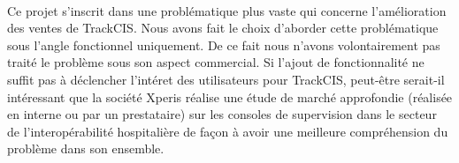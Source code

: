 	\paragraph{}
	Ce projet s'inscrit dans une problématique plus
	vaste qui concerne l'amélioration des ventes de TrackCIS. Nous avons fait le
	choix d'aborder cette problématique sous l'angle fonctionnel uniquement. De ce
	fait nous n'avons volontairement pas traité le problème sous son aspect
	commercial. Si l'ajout de fonctionnalité ne suffit pas à déclencher l'intéret
	des utilisateurs pour TrackCIS, peut-être serait-il intéressant que la
	société Xperis réalise une étude de marché approfondie (réalisée en interne ou
	par un prestataire) sur les consoles de supervision dans le secteur de
	l'interopérabilité hospitalière de façon à avoir une meilleure compréhension
	du problème dans son ensemble.
